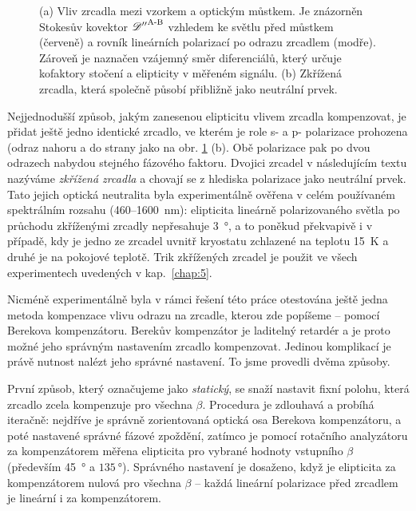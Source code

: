 \begin{figure}[htbp]
    \centering
    \begin{subfigure}{.6\textwidth}
        \centering
        
    \end{subfigure}
    \begin{subfigure}{.3\textwidth}
        \centering
        
    \end{subfigure}
\caption{(a) Vliv zrcadla mezi vzorkem a optickým můstkem. Je znázorněn Stokesův kovektor ${\mathscr{D}''}^\textrm{A-B}$ vzhledem ke světlu před můstkem (červeně) a rovník lineárních polarizací po odrazu zrcadlem (modře). Zároveň je naznačen vzájemný směr diferenciálů, který určuje kofaktory stočení a elipticity v měřeném signálu. (b) Zkřížená zrcadla, která společně působí přibližně jako neutrální prvek.}
    \label{fig:mustek-zrcadlo-data}
\end{figure}

Nejjednodušší způsob, jakým zanesenou elipticitu vlivem zrcadla kompenzovat, je přidat ještě jedno identické zrcadlo, ve kterém je role s- a p- polarizace prohozena (odraz nahoru a do strany jako na obr. \ref{fig:mustek-zrcadlo-data} (b).
Obě polarizace pak po dvou odrazech nabydou stejného fázového faktoru.
Dvojici zrcadel v následujícím textu nazýváme \emph{zkřížená zrcadla} a chovají se z hlediska polarizace jako neutrální prvek.
Tato jejich optická neutralita byla experimentálně ověřena v celém používaném spektrálním rozsahu (460--\SI{1600}{\nano\meter}): elipticita lineárně polarizovaného světla po průchodu zkříženými zrcadly nepřesahuje \SI{3}{\degree}, a to poněkud překvapivě i v případě, kdy je jedno ze zrcadel uvnitř kryostatu zchlazené na teplotu \SI{15}{\kelvin} a druhé je na pokojové teplotě.
Trik zkřížených zrcadel je použit ve všech experimentech uvedených v kap.~\ref{chap:5}.

Nicméně experimentálně byla v rámci řešení této práce otestována ještě jedna metoda kompenzace vlivu odrazu na zrcadle, kterou zde popíšeme -- pomocí Berekova kompenzátoru.
Berekův kompenzátor je laditelný retardér a je proto možné jeho správným nastavením zrcadlo kompenzovat.
Jedinou komplikací je právě nutnost nalézt jeho správné nastavení.
To jsme provedli dvěma způsoby.

První způsob, který označujeme jako \emph{statický}, se snaží nastavit fixní polohu, která zrcadlo zcela kompenzuje pro všechna $\beta$.
Procedura je zdlouhavá a probíhá iteračně: nejdříve je správně zorientovaná optická osa Berekova kompenzátoru, a poté nastavené správné fázové zpoždění, zatímco je pomocí rotačního analyzátoru za kompenzátorem měřena elipticita pro vybrané hodnoty vstupního $\beta$ (především \SI{45}{\degree} a $\SI{135}{\degree}$).
Správného nastavení je dosaženo, když je elipticita za kompenzátorem nulová pro všechna $\beta$ -- každá lineární polarizace před zrcadlem je lineární i za kompenzátorem.

